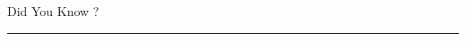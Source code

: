 \documentclass{book}
\begin{document}
\parbox{37mm}{Did You Know ?\par
\rule[4mm]{37mm}{1.5pt}}
\end{document}

